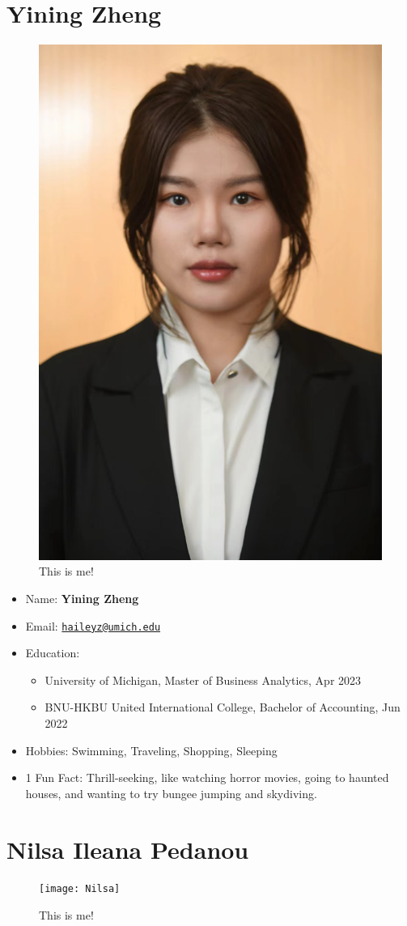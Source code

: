 \documentclass[
]{book}
\begin{document}
\hypertarget{yining-zheng}{%
\section{Yining Zheng}\label{yining-zheng}}

\begin{figure}
\includegraphics[width=0.2\linewidth,height=0.2\textheight]{Yining} \caption{This is me!}\label{fig:unnamed-chunk-7}
\end{figure}

\begin{itemize}
\item
  Name: \textbf{Yining Zheng}
\item
  Email: \href{mailto:haileyz@umich.edu}{\nolinkurl{haileyz@umich.edu}}
\item
  Education:

  \begin{itemize}
  \item
    University of Michigan, Master of Business Analytics, Apr 2023
  \item
    BNU-HKBU United International College, Bachelor of Accounting, Jun 2022
  \end{itemize}
\item
  Hobbies: Swimming, Traveling, Shopping, Sleeping
\item
  1 Fun Fact: Thrill-seeking, like watching horror movies, going to haunted houses, and wanting to try bungee jumping and skydiving.
\end{itemize}

\hypertarget{nilsa-ileana-pedanou}{%
\section{Nilsa Ileana Pedanou}\label{nilsa-ileana-pedanou}}

\begin{figure}
\texttt{[image: Nilsa]} \caption{This is me!}\label{fig:unnamed-chunk-8}
\end{figure}
\end{document}

